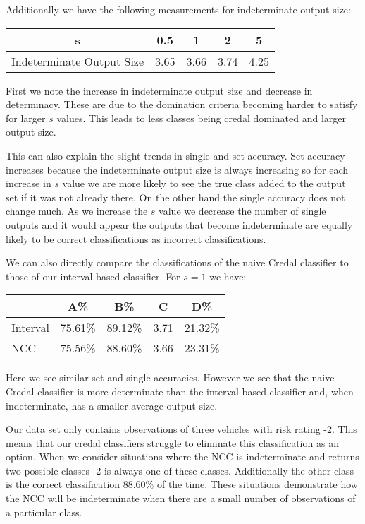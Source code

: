 Additionally we have the following measurements for indeterminate output size:
\begin{center}
\begin{tabular}{c|c c c c}
s & 0.5 & 1 & 2 & 5 \\
\hline
Indeterminate Output Size & 3.65 & 3.66 & 3.74 & 4.25
\end{tabular}
\end{center}

First we note the increase in indeterminate output size and decrease in determinacy.
These are due to the domination criteria becoming harder to satisfy for larger $s$ values.
This leads to less classes being credal dominated and larger output size.

This can also explain the slight trends in single and set accuracy.
Set accuracy increases because the indeterminate output size is always increasing so for each increase in $s$ value we are more likely to see the true class added to the output set if it was not already there.
On the other hand the single accuracy does not change much.
As we increase the $s$ value we decrease the number of single outputs and it would appear the outputs that become indeterminate are equally likely to be correct classifications as incorrect classifications.

We can also directly compare the classifications of the naive Credal classifier to those of our interval based classifier. For $s=1$ we have:
\begin{center}
\begin{tabular}{l|c c c c}
         & A\%     & B\%     & C    & D\%     \\
\hline
Interval & 75.61\% & 89.12\% & 3.71 & 21.32\% \\
NCC      & 75.56\% & 88.60\% & 3.66 & 23.31\% \\
\end{tabular}
\end{center}
Here we see similar set and single accuracies.
However we see that the naive Credal classifier is more determinate than the interval based classifier and, when indeterminate, has a smaller average output size.

Our data set only contains observations of three vehicles with risk rating -2.
This means that our credal classifiers struggle to eliminate this classification as an option.
When we consider situations where the NCC is indeterminate and returns two possible classes -2 is always one of these classes.
Additionally the other class is the correct classification 88.60\% of the time.
These situations demonstrate how the NCC will be indeterminate when there are a small number of observations of a particular class.

